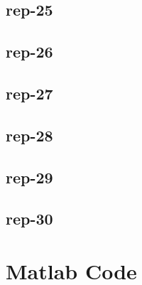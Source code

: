 \documentclass{article}
\begin{document}
\subsection{rep-25}
\subsection{rep-26}
\subsection{rep-27}
\subsection{rep-28}
\subsection{rep-29}
\subsection{rep-30}

\FloatBarrier

\appendix
\newpage
\section{Matlab Code}













\end{document}
